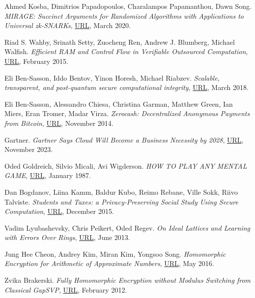 \documentclass{Resources/UoBLab1}
\theoremstyle{definition}
\begin{document}
\begin{thebibliography}{10}
 Ahmed Kosba, Dimitrios Papadopoulos, Charalampos Papamanthou, Dawn Song. \textit{MIRAGE: Succinct Arguments for Randomized Algorithms with Applications to Universal zk-SNARKs}, \href{https://eprint.iacr.org/2020/278.pdf}{URL}, March 2020.

 Riad S. Wahby, Srinath Setty, Zuocheng Ren, Andrew J. Blumberg, Michael Walfish. \textit{Efficient RAM and Control Flow in Verifiable Outsourced Computation}, \href{https://www.ndss-symposium.org/wp-content/uploads/2017/09/07_3_2.pdf}{URL}, February 2015.

 Eli Ben-Sasson, Iddo Bentov, Yinon Horesh, Michael Riabzev. \textit{Scalable, transparent, and post-quantum secure computational integrity}, \href{https://eprint.iacr.org/2018/046.pdf}{URL}, March 2018.

 Eli Ben-Sasson, Alessandro Chiesa, Christina Garman, Matthew Green, Ian Miers, Eran Tromer, Madar Virza. \textit{Zerocash: Decentralized Anonymous Payments from Bitcoin}, \href{https://ieeexplore.ieee.org/stamp/stamp.jsp?tp=&arnumber=6956581}{URL}, November 2014.

 Gartner. \textit{Gartner Says Cloud Will Become a Business Necessity by 2028}, \href{https://www.gartner.com/en/newsroom/press-releases/2023-11-29-gartner-says-cloud-will-become-a-business-necessity-by-2028}{URL}, November 2023.

 Oded Goldreich, Silvio Micali, Avi Wigderson. \textit{HOW TO PLAY ANY MENTAL GAME}, \href{https://dl.acm.org/doi/pdf/10.1145/28395.28420}{URL}, January 1987.

 Dan Bogdanov, Liina Kamm, Baldur Kubo, Reimo Rebane, Ville Sokk, Riivo Talviste. \textit{Students and Taxes: a Privacy-Preserving Social Study Using Secure Computation}, \href{https://eprint.iacr.org/2015/1159.pdf}{URL}, December 2015.

 Vadim Lyubashevsky, Chris Peikert, Oded Regev. \textit{On Ideal Lattices and Learning with Errors Over Rings}, \href{https://eprint.iacr.org/2012/230.pdf}{URL}, June 2013.

 Jung Hee Cheon, Andrey Kim, Miran Kim, Yongsoo Song. \textit{Homomorphic Encryption for Arithmetic of Approximate Numbers}, \href{https://eprint.iacr.org/2016/421.pdf}{URL}, May 2016.

 Zvika Brakerski. \textit{Fully Homomorphic Encryption without Modulus Switching from Classical GapSVP}, \href{https://eprint.iacr.org/2012/078.pdf}{URL}, February 2012.


\end{thebibliography}
\end{document}
